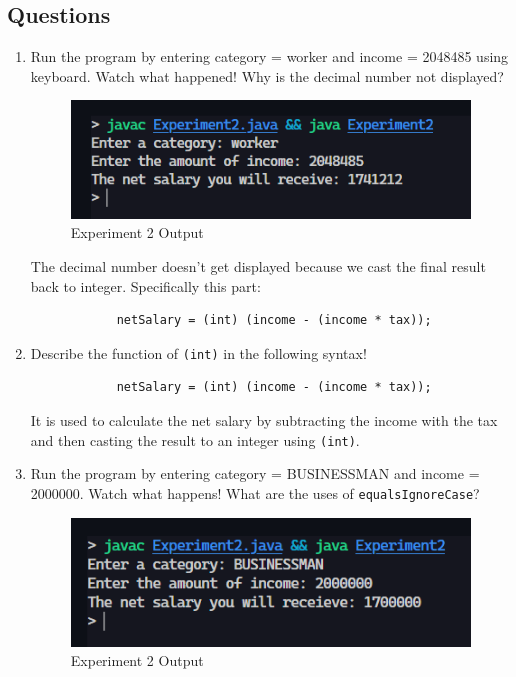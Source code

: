 \documentclass[12pt,titlepage]{article}
\begin{document}
\subsection*{Questions}
\begin{enumerate}
    \item {
        Run the program by entering category = worker and income = 2048485 using keyboard.
        Watch what happened! Why is the decimal number not displayed?

        \begin{figure}[h]
            \centering
            \includegraphics[width=.5\textwidth]{images/experiment2-output.png}
            \caption{Experiment 2 Output}
        \end{figure}

        The decimal number doesn't get displayed because we cast the final result back to integer.
        Specifically this part: 
        
        \begin{verbatim}
            netSalary = (int) (income - (income * tax));
        \end{verbatim}
    }
    \pagebreak
    \item {
        Describe the function of \texttt{(int)} in the following syntax!

        \begin{verbatim}
            netSalary = (int) (income - (income * tax));
        \end{verbatim}

        It is used to calculate the net salary by subtracting the income with the tax and then
        casting the result to an integer using \texttt{(int)}.
    }
    \item {
        Run the program by entering category = BUSINESSMAN and income = 2000000.
        Watch what happens! What are the uses of \texttt{equalsIgnoreCase}?

        \begin{figure}[h]
            \centering
            \includegraphics[width=.5\textwidth]{images/experiment2-uppercased.png}
            \caption{Experiment 2 Output}
        \end{figure}

}
\end{enumerate}
\end{document}
